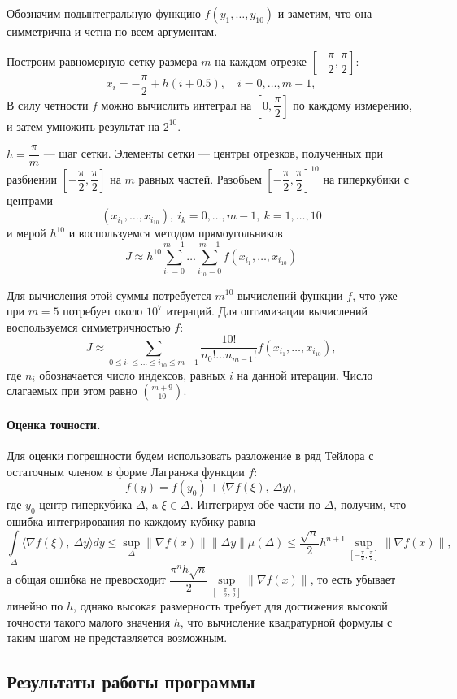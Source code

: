 \documentclass[16pt]{article}
\begin{document}
Обозначим подынтегральную функцию $f(y_1, \ldots, y_{10})$ и заметим, что она симметрична и четна по всем аргументам.

Построим равномерную сетку размера $m$ на каждом отрезке $\left[-\dfrac{\pi}{2}, \dfrac{\pi}{2}\right]$:
$$x_i = -\frac{\pi}{2} + h(i + 0.5), \quad i = 0, \ldots, m-1,$$
В силу четности $f$ можно вычислить интеграл на $\left[0, \dfrac{\pi}2\right]$ по каждому измерению, и затем умножить результат на $2^{10}$.

$h = \dfrac{\pi}{m}$ --- шаг сетки. Элементы сетки --- центры отрезков, полученных при разбиении $\left[-\dfrac{\pi}{2}, \dfrac{\pi}{2}\right]$ на $m$ равных частей. Разобьем $\left[-\dfrac{\pi}{2}, \dfrac{\pi}{2}\right]^{10}$ на гиперкубики с центрами $$(x_{i_1}, \ldots, x_{i_{10}}),\ i_k = 0, \ldots, m-1,\ k = 1, \ldots, 10$$ и мерой $h^{10}$ и воспользуемся методом прямоугольников
$$J \approx h^{10}\sum_{i_1=0}^{m-1}\ldots\sum_{i_{10}=0}^{m-1}f(x_{i_1}, \ldots, x_{i_{10}})$$

Для вычисления этой суммы потребуется $m^{10}$ вычислений функции $f$, что уже при $m = 5$ потребует около $10^7$ итераций. Для оптимизации вычислений воспользуемся симметричностью $f$:
$$J \approx \sum_{0 \leq i_1 \leq \ldots \leq i_{10} \leq m-1} \dfrac{10!}{n_0!\ldots n_{m-1}!}f(x_{i_1}, \ldots, x_{i_{10}}),$$
где $n_i$ обозначается число индексов, равных $i$ на данной итерации. Число слагаемых при этом равно ${m + 9 \choose 10}$. 

\paragraph{Оценка точности.} Для оценки погрешности будем использовать разложение в ряд Тейлора с остаточным членом в форме Лагранжа функции $f$:
$$f(y) = f(y_0) + \langle \nabla f(\xi), \ \Delta y\rangle,$$
где $y_0$ центр гиперкубика $\Delta$, a $\xi \in \Delta$. Интегрируя обе части по $\Delta$, получим, что ошибка интегрирования по каждому кубику равна
$$\int\limits_\Delta \langle \nabla f(\xi), \ \Delta y\rangle dy \leq \sup_\Delta \|\nabla f(x)\|\|\Delta y\|\mu(\Delta) \leq \dfrac{\sqrt{n}}{2}h^{n+1}\sup_{\left[-\frac{\pi}2, \frac{\pi}2\right]} \|\nabla f(x)\|,$$
а общая ошибка не превосходит $\dfrac{\pi^nh\sqrt{n}}{2}\sup\limits_{\left[-\frac{\pi}2, \frac{\pi}2\right]} \|\nabla f(x)\|$, то есть убывает линейно по $h$, однако высокая размерность требует для достижения высокой точности такого малого значения $h$, что вычисление квадратурной формулы с таким шагом не представляется возможным.
\subsection{Результаты работы программы}
\end{document}
